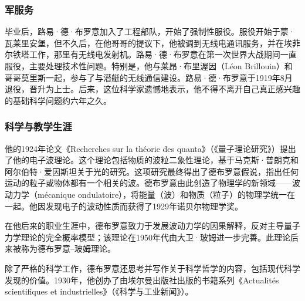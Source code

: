 \subsubsection{军服务}
毕业后，路易·德·布罗意加入了工程部队，开始了强制性服役。服役开始于蒙·瓦莱里安堡，但不久后，在他哥哥的提议下，他被调到无线电通讯服务，并在埃菲尔铁塔工作，那里有无线电发射机。路易·德·布罗意在第一次世界大战期间一直服役，主要处理技术性问题。特别是，他与莱昂·布里渥因（Léon Brillouin）和哥哥莫里斯一起，参与了与潜艇的无线通信建设。路易·德·布罗意于1919年8月退役，晋升为上士。后来，这位科学家遗憾地表示，他不得不离开自己真正感兴趣的基础科学问题约六年之久。
\subsubsection{科学与教学生涯}  
他的1924年论文《Recherches sur la théorie des quanta》（《量子理论研究》）提出了他的电子波理论。这个理论包括物质的波粒二象性理论，基于马克斯·普朗克和阿尔伯特·爱因斯坦关于光的研究。这项研究最终得出了德布罗意假说，指出任何运动的粒子或物体都有一个相关的波。德布罗意由此创造了物理学的新领域——波动力学（mécanique ondulatoire），将能量（波）和物质（粒子）的物理学统一在一起。他因发现电子的波动性质而获得了1929年诺贝尔物理学奖。

在他后来的职业生涯中，德布罗意致力于发展波动力学的因果解释，反对主导量子力学理论的完全概率模型；该理论在1950年代由大卫·玻姆进一步完善。此理论后来被称为德布罗意–玻姆理论。

除了严格的科学工作，德布罗意还思考并写作关于科学哲学的内容，包括现代科学发现的价值。1930年，他创办了由埃尔曼出版社出版的书籍系列《Actualités scientifiques et industrielles》（《科学与工业新闻》）。